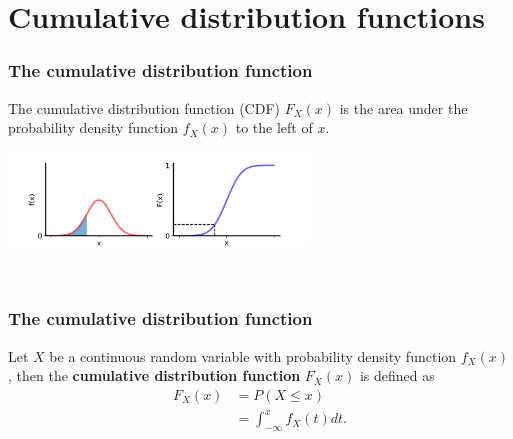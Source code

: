 \documentclass[9pt]{beamer}
\begin{document}
\section{Cumulative distribution functions}
\begin{frame}
\frametitle{The cumulative distribution function}

The cumulative distribution function (CDF) $F_X(x)$ is the area under the probability density function $f_X(x)$ to the left of $x$.

\begin{center}
\includegraphics[height=2.5cm]{images/pdf_cdf_1.png}
\end{center}


\


\end{frame}

\begin{frame}
\frametitle{The cumulative distribution function}


\vspace{.3cm}

\begin{definition} 
Let $X$ be a continuous random variable with probability density function $f_X(x)$, then the \textbf{cumulative distribution function} $F_X(x)$ is defined as
\begin{align*}
F_X(x) &= P(X \leq x)\\
&= \int_{-\infty}^x f_X(t) dt.
\end{align*} 
\end{definition}

\vspace{0.5cm}


\end{frame}
\end{document}

